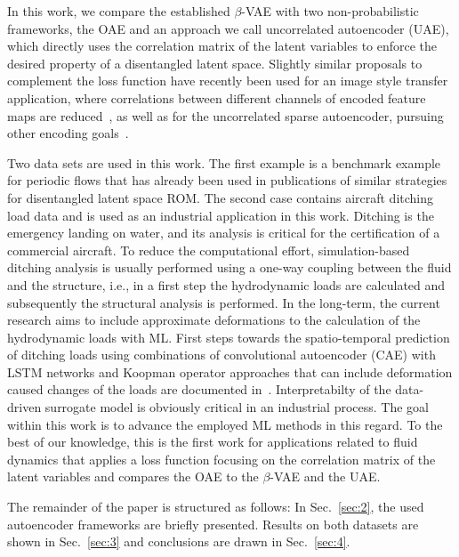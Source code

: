 In this work, we compare the established $\beta$-VAE with two non-probabilistic frameworks, the OAE and an approach we call uncorrelated autoencoder (UAE), which directly uses the correlation matrix of the latent variables to enforce the desired property of a disentangled latent space. 
Slightly similar proposals to complement the loss function have recently been used for an image style transfer application, where correlations between different channels of encoded feature maps are reduced~\cite{KIM2021148}, as well as for the uncorrelated sparse autoencoder, pursuing other encoding goals~\cite{Savargaonkar:2024}.
  
Two data sets are used in this work. The first example is a benchmark example for periodic flows that has already been used in publications of similar strategies for disentangled latent space ROM. The second case contains aircraft ditching load data and is used as an industrial application in this work. 
Ditching is the emergency landing on water, and its analysis is critical for the certification of a commercial aircraft. To reduce the computational effort, simulation-based ditching analysis is usually performed using a one-way coupling between the fluid and the structure, i.e., in a first step the hydrodynamic loads are calculated and subsequently the structural analysis is performed. 
In the long-term, the current research aims to include approximate deformations to the calculation of the hydrodynamic loads with ML. 
First steps towards the spatio-temporal prediction of ditching loads using combinations of convolutional autoencoder (CAE) with LSTM networks and Koopman operator approaches that can include deformation caused changes of the loads are documented in~\cite{schwarz:2024}.  
Interpretabilty of the data-driven surrogate model is obviously critical in an industrial process. The goal within this work is to advance the employed ML methods in this regard.
To the best of our knowledge, this is the first work for applications related to fluid dynamics that applies a loss function focusing on the correlation matrix of the latent variables and compares the OAE to the $\beta$-VAE and the UAE.

The remainder of the paper is structured as follows: In Sec.~\ref{sec:2}, the used autoencoder frameworks are briefly presented. Results on both datasets are shown in Sec.~\ref{sec:3} and conclusions are drawn in Sec.~\ref{sec:4}.   


